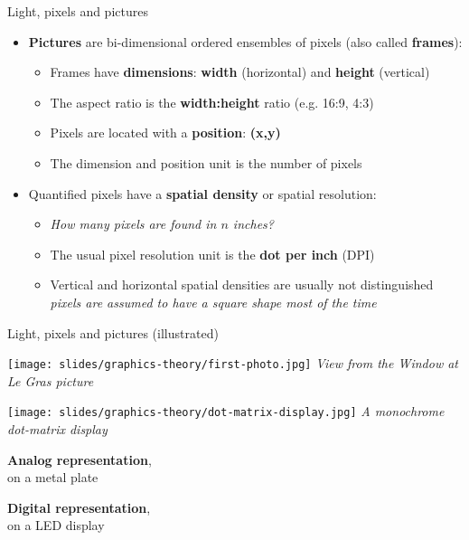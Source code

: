 \begin{frame}{Light, pixels and pictures}
  \begin{itemize}
  \item \textbf{Pictures} are bi-dimensional ordered ensembles of pixels (also called \textbf{frames}):
    \begin{itemize}
    \item Frames have \textbf{dimensions}: \textbf{width} (horizontal) and \textbf{height} (vertical)
    \item The aspect ratio is the \textbf{width:height} ratio (e.g. 16:9, 4:3)
    \item Pixels are located with a \textbf{position}: \textbf{(x,y)}
    \item The dimension and position unit is the number of pixels
    \end{itemize}
  \item Quantified pixels have a \textbf{spatial density} or spatial resolution:\\
    \begin{itemize}
    \item \textit{How many pixels are found in \(n\) inches?}
    \item The usual pixel resolution unit is the \textbf{dot per inch} (DPI)
    \item Vertical and horizontal spatial densities are usually not distinguished\\
      \textit{pixels are assumed to have a square shape most of the time}
    \end{itemize}
  \end{itemize}

\end{frame}

\begin{frame}{Light, pixels and pictures (illustrated)}
  \begin{minipage}[b]{0.45\textwidth}
    \centering
    \texttt{[image: slides/graphics-theory/first-photo.jpg]}
    \textit{\small View from the Window at Le Gras picture}
  \end{minipage}
  \hfill
  \begin{minipage}[b]{0.45\textwidth}
    \centering
    \texttt{[image: slides/graphics-theory/dot-matrix-display.jpg]}
    \textit{\small A monochrome dot-matrix display}
  \end{minipage}

  \vspace{1em}

  \begin{minipage}[b]{0.45\textwidth}
    \centering
    \textbf{Analog representation},\\ on a metal plate
  \end{minipage}
  \hfill
  \begin{minipage}[b]{0.45\textwidth}
    \centering
    \textbf{Digital representation},\\ on a LED display
  \end{minipage}
\end{frame}

